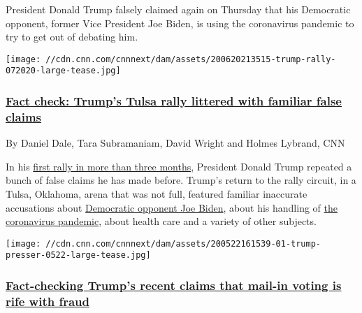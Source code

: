 President Donald Trump falsely claimed again on Thursday that his
Democratic opponent, former Vice President Joe Biden, is using the
coronavirus pandemic to try to get out of debating him.

\href{/2020/06/21/politics/fact-check-donald-trump-tulsa-rally/index.html}{}

\texttt{[image: //cdn.cnn.com/cnnnext/dam/assets/200620213515-trump-rally-072020-large-tease.jpg]}

\hypertarget{fact-check-trumps-tulsa-rally-littered-with-familiar-false-claims}{%
\subsubsection{\texorpdfstring{\href{/2020/06/21/politics/fact-check-donald-trump-tulsa-rally/index.html}{Fact
check: Trump's Tulsa rally littered with familiar false
claims}}{Fact check: Trump's Tulsa rally littered with familiar false claims}}\label{fact-check-trumps-tulsa-rally-littered-with-familiar-false-claims}}

By Daniel Dale, Tara Subramaniam, David Wright and Holmes Lybrand, CNN

In his
\href{https://www.cnn.com/2020/06/20/politics/tulsa-rally-trump/index.html}{first
rally in more than three months}, President Donald Trump repeated a
bunch of false claims he has made before. Trump's return to the rally
circuit, in a Tulsa, Oklahoma, arena that was not full, featured
familiar inaccurate accusations about
\href{https://www.cnn.com/election/2020/candidate/biden}{Democratic
opponent Joe Biden}, about his handling of
\href{https://www.cnn.com/interactive/2020/health/coronavirus-us-maps-and-cases/}{the
coronavirus pandemic}, about health care and a variety of other
subjects.

\href{/2020/05/27/app-politics-section/donald-trump-mail-in-voter-fraud-fact-check/index.html}{}

\texttt{[image: //cdn.cnn.com/cnnnext/dam/assets/200522161539-01-trump-presser-0522-large-tease.jpg]}

\hypertarget{fact-checking-trumps-recent-claims-that-mail-in-voting-is-rife-with-fraud}{%
\subsubsection{\texorpdfstring{\href{/2020/05/27/app-politics-section/donald-trump-mail-in-voter-fraud-fact-check/index.html}{Fact-checking
Trump's recent claims that mail-in voting is rife with
fraud}}{Fact-checking Trump's recent claims that mail-in voting is rife with fraud}}\label{fact-checking-trumps-recent-claims-that-mail-in-voting-is-rife-with-fraud}}

